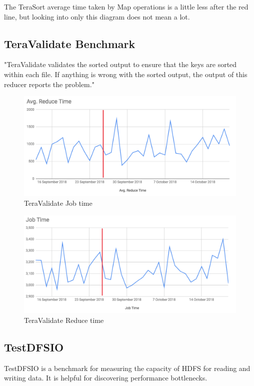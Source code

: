 The TeraSort average time taken by Map operations is a little less after the red line, but looking into only this diagram does not mean a lot.

\subsection{TeraValidate Benchmark}
"TeraValidate validates the sorted output to ensure that the keys are sorted within each file. If anything is wrong with the sorted output, the output of this reducer reports the problem." \cite{terasort}

\begin{figure}[H]
	\includegraphics[width=125mm, keepaspectratio]{figures/teravalidate_job.png}
	\centering
	\caption{TeraValidate Job time}
\end{figure}
\begin{figure}[H]
	\includegraphics[width=125mm, keepaspectratio]{figures/teravalidate_reduce.png}
	\centering
	\caption{TeraValidate Reduce time}
\end{figure}

\subsection{TestDFSIO}
TestDFSIO is a benchmark for measuring the capacity of HDFS for reading and writing data. It is helpful for discovering performance bottlenecks.

